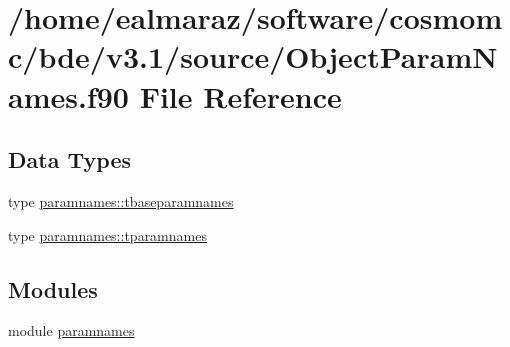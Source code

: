 \hypertarget{ObjectParamNames_8f90}{}\section{/home/ealmaraz/software/cosmomc/bde/v3.1/source/\+Object\+Param\+Names.f90 File Reference}
\label{ObjectParamNames_8f90}
\subsection*{Data Types}
\begin{DoxyCompactItemize}
\item 
type \mbox{\hyperlink{structparamnames_1_1tbaseparamnames}{paramnames\+::tbaseparamnames}}
\item 
type \mbox{\hyperlink{structparamnames_1_1tparamnames}{paramnames\+::tparamnames}}
\end{DoxyCompactItemize}
\subsection*{Modules}
\begin{DoxyCompactItemize}
\item 
module \mbox{\hyperlink{namespaceparamnames}{paramnames}}
\end{DoxyCompactItemize}
